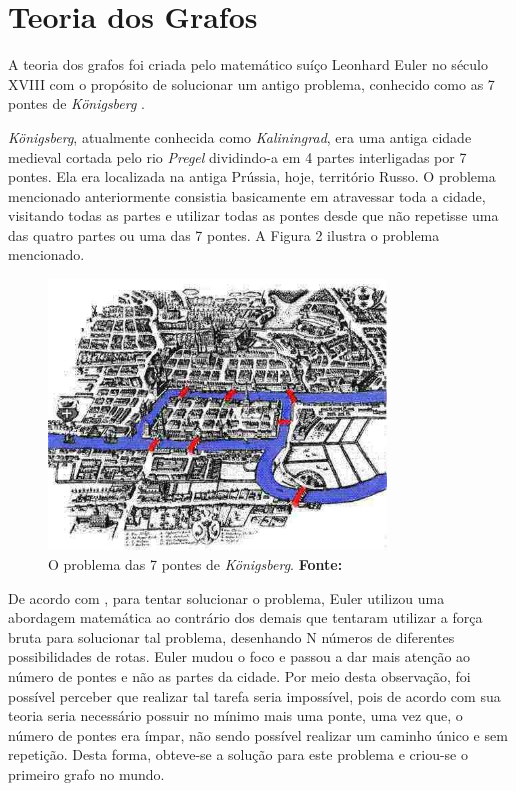 \section{Teoria dos Grafos}

\par A teoria dos grafos foi criada pelo matemático suíço Leonhard Euler no século XVIII com o propósito de solucionar um antigo problema, conhecido como as 7 pontes de \textit{Königsberg} \cite{harju_graph_theory}.

\par \textit{Königsberg}, atualmente conhecida como \textit{Kaliningrad}, era uma antiga cidade medieval cortada pelo rio \textit{Pregel} dividindo-a em 4 partes interligadas por 7 pontes. Ela era localizada na antiga Prússia, hoje, território Russo. O problema mencionado anteriormente consistia basicamente em atravessar toda a cidade, visitando todas as partes e utilizar todas as pontes desde que não repetisse uma das quatro partes ou uma das 7 pontes. A Figura 2 ilustra o problema mencionado.

\begin{figure}[h!]
	\centerline{\includegraphics[height=0.26\textheight,width=0.8\textwidth]{./imagens/Konigsberg_7_bridges.jpg}}
	\caption[O problema das 7 pontes de \textit{Königsberg} ]
	{O problema das 7 pontes de \textit{Königsberg}. \textbf{Fonte:} }
	\label{fig:exemplo1}
\end{figure}

\par De acordo com , para tentar solucionar o problema, Euler utilizou uma abordagem matemática ao contrário dos demais que tentaram utilizar a força bruta para solucionar tal problema, desenhando N números de diferentes possibilidades de rotas. Euler mudou o foco e passou a dar mais atenção ao número de pontes e não as partes da cidade. Por meio desta observação, foi possível perceber que realizar tal tarefa seria impossível, pois de acordo com sua teoria seria necessário possuir no mínimo mais uma ponte, uma vez que, o número de pontes era ímpar, não sendo possível realizar um caminho único e sem repetição. Desta forma, obteve-se a solução para este problema e criou-se o primeiro grafo no mundo.

